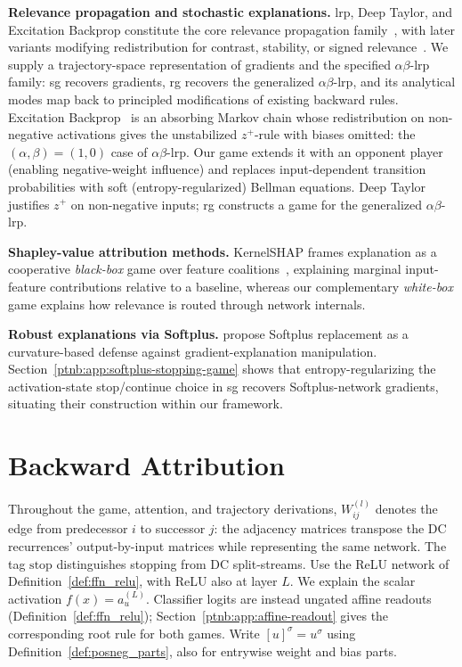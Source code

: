 \textbf{Relevance propagation and stochastic explanations.} \ac{lrp}, Deep Taylor, and Excitation
Backprop constitute the core relevance propagation family~\parencite{Bach2015,Montavon2017DeepTaylor,Zhang2018pointinggame}, with later variants modifying redistribution for contrast, stability, or
signed relevance~\parencite{Binder2016LRN,Kohlbrenner2020,Gu2019CLRP,Nam2020,vukadin2024abslrp}. We supply
a trajectory-space representation of gradients and the specified $\alpha\beta$-\ac{lrp} family: \ac{sg} recovers gradients, \ac{rg} recovers
the generalized $\alpha\beta$-\ac{lrp}, and its analytical modes map back to principled modifications
of existing backward rules.
Excitation Backprop~\parencite{Zhang2018pointinggame} is an absorbing Markov chain whose redistribution
on non-negative activations gives the unstabilized $z^+$-rule with biases omitted: the
$(\alpha,\beta)=(1,0)$ case of $\alpha\beta$-\ac{lrp}. Our game extends it with an opponent player (enabling negative-weight influence) and replaces
input-dependent transition probabilities with soft (entropy-regularized) Bellman equations.
Deep Taylor~\parencite{Montavon2017DeepTaylor} justifies $z^+$ on non-negative inputs;
\ac{rg} constructs a game for the generalized $\alpha\beta$-\ac{lrp}.

\textbf{Shapley-value attribution methods.} KernelSHAP frames explanation as a cooperative \emph{black-box} game over feature coalitions~\parencite{LundbergLee2017}, explaining marginal input-feature contributions relative to a
baseline, whereas our complementary \emph{white-box} game explains how relevance is routed through network internals.

\textbf{Robust explanations via Softplus.} \textcite{Dombrowski2020} propose Softplus replacement as a
curvature-based defense against gradient-explanation manipulation.
Section~\ref{ptnb:app:softplus-stopping-game} shows that entropy-regularizing the activation-state
stop/continue choice in \ac{sg} recovers Softplus-network gradients, situating their construction
within our framework.

\section{Backward Attribution}\label{ptnb:sec:background}

Throughout the game, attention, and trajectory derivations, $W^{(l)}_{ij}$ denotes the edge from
predecessor $i$ to successor $j$: the adjacency matrices transpose the DC recurrences' output-by-input
matrices while representing the same network. The tag $\mathrm{stop}$ distinguishes stopping from
DC split-streams. Use the ReLU network of Definition~\ref{def:ffn_relu}, with ReLU also at layer $L$.
We explain the scalar activation $f(x)=a_u^{(L)}$.
Classifier logits are instead ungated affine readouts (Definition~\ref{def:ffn_relu}); Section~\ref{ptnb:app:affine-readout} gives the corresponding root rule for both games.
Write $[u]^\sigma=u^\sigma$ using Definition~\ref{def:posneg_parts}, also for entrywise weight and bias parts.

